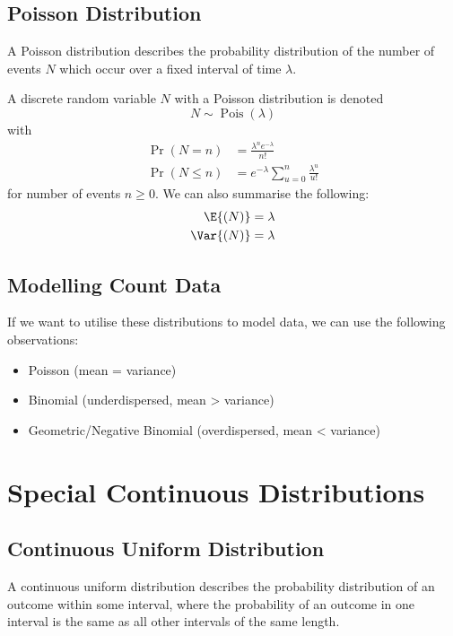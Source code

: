 \documentclass{article}
\begin{document}
\begin{multicols}{3}
    \subsection{Poisson Distribution}
    A Poisson distribution describes the probability distribution of the number of events \(N\) which occur over a fixed interval of time \(\lambda\).

    A discrete random variable \(N\) with a Poisson distribution is denoted
    \begin{equation*}
        N \sim \operatorname{Pois}{\left( \lambda \right)}
    \end{equation*}
    with
    \begin{align*}
        \Pr{\left( N = n \right)}    & = \frac{\lambda^n e^{-\lambda}}{n!}                \\
        \Pr{\left( N \leq n \right)} & = e^{-\lambda} \sum_{u = 0}^n \frac{\lambda^u}{u!}
    \end{align*}
    for number of events \(n \geq 0\).
    We can also summarise the following:
    \begin{align*}
        \E{\left( N \right)}   & = \lambda \\
        \Var{\left( N \right)} & = \lambda
    \end{align*}
    \subsection{Modelling Count Data}
    If we want to utilise these distributions to model data, we can use the following observations:
    \begin{itemize}
        \item Poisson (mean = variance)
        \item Binomial (underdispersed, mean > variance)
        \item Geometric/Negative Binomial (overdispersed, mean < variance)
    \end{itemize}
    \section{Special Continuous Distributions}
    \subsection{Continuous Uniform Distribution}
    A continuous uniform distribution describes the probability distribution of an outcome within some
    interval, where the probability of an outcome in one interval is the same as all other intervals of the same length.


\end{multicols}
\end{document}
